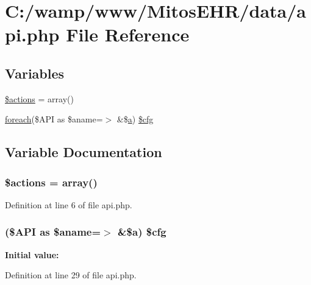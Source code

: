 \hypertarget{api_8php}{\section{\-C\-:/wamp/www/\-Mitos\-E\-H\-R/data/api.php \-File \-Reference}
\label{api_8php}
}
\subsection*{\-Variables}
\begin{DoxyCompactItemize}
\item 
\hyperlink{api_8php_a6cafc5f8d4f5d73acc0b5c6daaa766c1}{\$actions} = array()
\item 
\hyperlink{php_thumb_8demo_8demo_8php_a9caa026f841c5a6057418795d37e0ef9}{foreach}(\$\-A\-P\-I as \$aname=$>$ \&\$\hyperlink{classa}{a}) \hyperlink{api_8php_af1915c9692b050d60239e2d4c011a4a7}{\$cfg}
\end{DoxyCompactItemize}


\subsection{\-Variable \-Documentation}
\hypertarget{api_8php_a6cafc5f8d4f5d73acc0b5c6daaa766c1}{
\subsubsection[{\$actions}]{\setlength{\rightskip}{0pt plus 5cm}\$actions = array()}}\label{api_8php_a6cafc5f8d4f5d73acc0b5c6daaa766c1}


\-Definition at line 6 of file api.\-php.

\hypertarget{api_8php_af1915c9692b050d60239e2d4c011a4a7}{
\subsubsection[{\$cfg}]{ (\$\-A\-P\-I as \$aname=$>$ \&\${\bf a}) \$cfg}}\label{api_8php_af1915c9692b050d60239e2d4c011a4a7}
{\bfseries \-Initial value\-:}


\-Definition at line 29 of file api.\-php.

